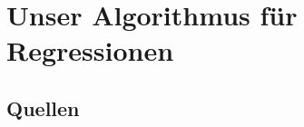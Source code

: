 \documentclass[a4paper,12pt]{article}
\begin{document}
\section{Unser Algorithmus für Regressionen}

\begin{appendix}
\section{Quellen}
\end{appendix}
\end{document}
